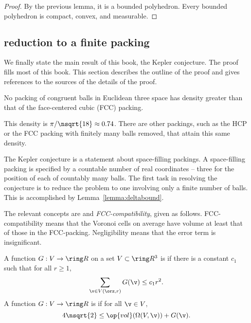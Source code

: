 \begin{cnl}
\begin{proof} By the previous lemma, it is a bounded polyhedron.
  Every bounded polyhedron is compact, convex, and measurable.
\end{proof}




\subsection{reduction to a finite packing}\label{reduction to finite}

We finally state the main result of this book, the Kepler conjecture.
The proof fills most of this book. This section describes the
outline of the proof and gives references to the sources of the
details of the proof.


\begin{theorem*}
\label{theorem:kepler}
No packing of congruent balls in Euclidean three space has density
greater than that of the face-centered cubic (FCC) packing.
\end{theorem*}
%
%
%
%
%

\begin{remark}
This density is $\pi/\nsqrt{18}\approx 0.74$.  There are other
packings, such as the HCP or the FCC
packing with finitely many balls removed, that attain this
same density.
\end{remark}

The Kepler conjecture is a statement about space-filling packings.  A
space-filling packing is specified by a countable number of real
coordinates -- three for the position of each of countably many balls.
The first task in resolving the conjecture is to reduce the problem to
one involving only a finite number of balls.  This is accomplished by
Lemma~\ref{lemma:deltabound}.

The relevant concepts are  and {\it
  FCC-compatibility}, given as follows.  FCC-compatibility means that
the Voronoi cells on average have volume at least that of those in the
FCC-packing.  Negligibility means that the error term is insignificant.


\begin{definition}
\label{def:negligible}
A function $G:V\to \Real$ on a set $V\subset\vecR{3}$
is 
if there is a constant $c_1$ such that for all $r\ge1$,
\[ \sumfinitepred{\v}{\v\in \Vee{V}(\orz,r)}{G(\v)} \le c_1
r^2.\] 
A function $G: V\to\Real$ is
if for all $\v\in V$, 
\[ 4\nsqrt{2}\le \op{vol}(\Omega(V,\v)) +
G(\v).\] 
%
\end{definition}



\end{cnl}

